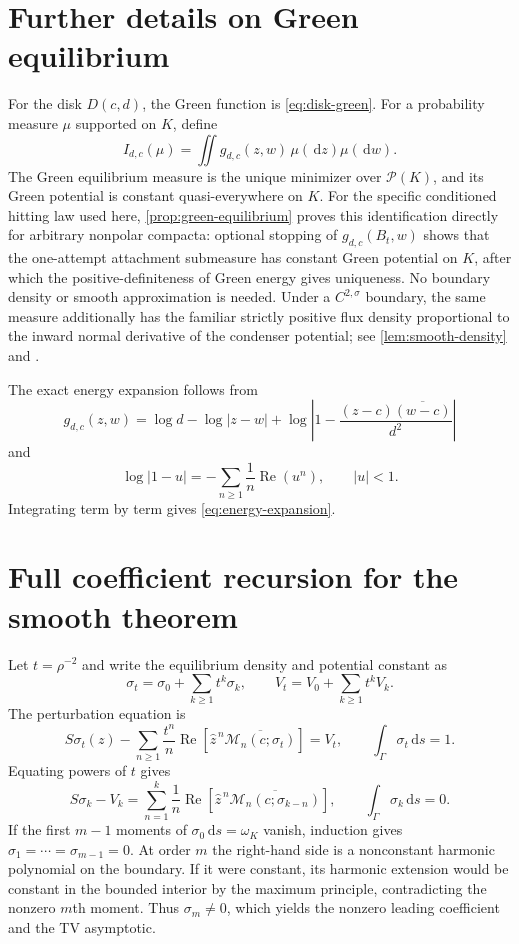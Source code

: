 \documentclass[11pt]{article}
\theoremstyle{mainthm}
\theoremstyle{definition}
\theoremstyle{remark}
\newcommand{\dd}{\,\mathrm d}
\newcommand{\Real}{\operatorname{Re}}
\begin{document}
\appendix

\section{Further details on Green equilibrium}
\label{app:green-details}

For the disk $D(c,d)$, the Green function is \eqref{eq:disk-green}. For a probability measure $\mu$ supported on $K$, define
\[
  I_{d,c}(\mu)=\iint g_{d,c}(z,w)\,\mu(\dd z)\mu(\dd w).
\]
The Green equilibrium measure is the unique minimizer over $\mathcal P(K)$, and its Green potential is constant quasi-everywhere on $K$. For the specific conditioned hitting law used here, \cref{prop:green-equilibrium} proves this identification directly for arbitrary nonpolar compacta: optional stopping of $g_{d,c}(B_t,w)$ shows that the one-attempt attachment submeasure has constant Green potential on $K$, after which the positive-definiteness of Green energy gives uniqueness. No boundary density or smooth approximation is needed. Under a $C^{2,\sigma}$ boundary, the same measure additionally has the familiar strictly positive flux density proportional to the inward normal derivative of the condenser potential; see \cref{lem:smooth-density} and \cite{Ransford1995,SaffTotik1997,Pouliasis2013}.

The exact energy expansion follows from
\[
  g_{d,c}(z,w)
  =\log d-\log|z-w|
   +\log\left|1-\frac{(z-c)\overline{(w-c)}}{d^2}\right|
\]
and
\[
  \log|1-u|=-\sum_{n\ge1}\frac1n\Real(u^n),
  \qquad |u|<1.
\]
Integrating term by term gives \eqref{eq:energy-expansion}.

\section{Full coefficient recursion for the smooth theorem}
\label{app:smooth-proof}

Let $t=\rho^{-2}$ and write the equilibrium density and potential constant as
\[
  \sigma_t=\sigma_0+\sum_{k\ge1}t^k\sigma_k,
  \qquad
  V_t=V_0+\sum_{k\ge1}t^kV_k.
\]
The perturbation equation is
\[
  S\sigma_t(z)
  -\sum_{n\ge1}\frac{t^n}{n}
  \Real\left[
    \widehat z^{\,n}\overline{\mathcal M_n(c;\sigma_t)}
  \right]
  =V_t,
  \qquad
  \int_\Gamma\sigma_t\dd s=1.
\]
Equating powers of $t$ gives
\[
  S\sigma_k-V_k
  =\sum_{n=1}^{k}\frac1n
   \Real\left[
     \widehat z^{\,n}
     \overline{\mathcal M_n(c;\sigma_{k-n})}
   \right],
  \qquad
  \int_\Gamma\sigma_k\dd s=0.
\]
If the first $m-1$ moments of $\sigma_0\dd s=\omega_K$ vanish, induction gives $\sigma_1=\cdots=\sigma_{m-1}=0$. At order $m$ the right-hand side is a nonconstant harmonic polynomial on the boundary. If it were constant, its harmonic extension would be constant in the bounded interior by the maximum principle, contradicting the nonzero $m$th moment. Thus $\sigma_m\ne0$, which yields the nonzero leading coefficient and the TV asymptotic.
\end{document}
